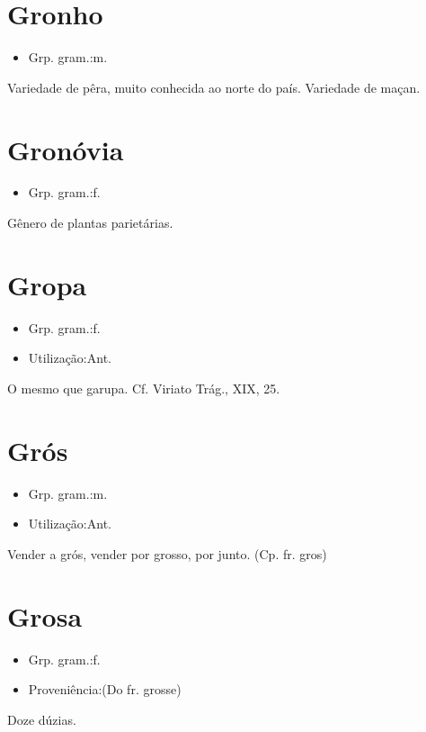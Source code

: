 \section{Gronho}
\begin{itemize}
\item {Grp. gram.:m.}
\end{itemize}
Variedade de pêra, muito conhecida ao norte do país.
Variedade de maçan.
\section{Gronóvia}
\begin{itemize}
\item {Grp. gram.:f.}
\end{itemize}
Gênero de plantas parietárias.
\section{Gropa}
\begin{itemize}
\item {Grp. gram.:f.}
\end{itemize}
\begin{itemize}
\item {Utilização:Ant.}
\end{itemize}
O mesmo que \textunderscore garupa\textunderscore . Cf. \textunderscore Viriato Trág.\textunderscore , XIX, 25.
\section{Grós}
\begin{itemize}
\item {Grp. gram.:m.}
\end{itemize}
\begin{itemize}
\item {Utilização:Ant.}
\end{itemize}
\textunderscore Vender a grós\textunderscore , vender por grosso, por junto.
(Cp. fr. \textunderscore gros\textunderscore )
\section{Grosa}
\begin{itemize}
\item {Grp. gram.:f.}
\end{itemize}
\begin{itemize}
\item {Proveniência:(Do fr. \textunderscore grosse\textunderscore )}
\end{itemize}
Doze dúzias.
